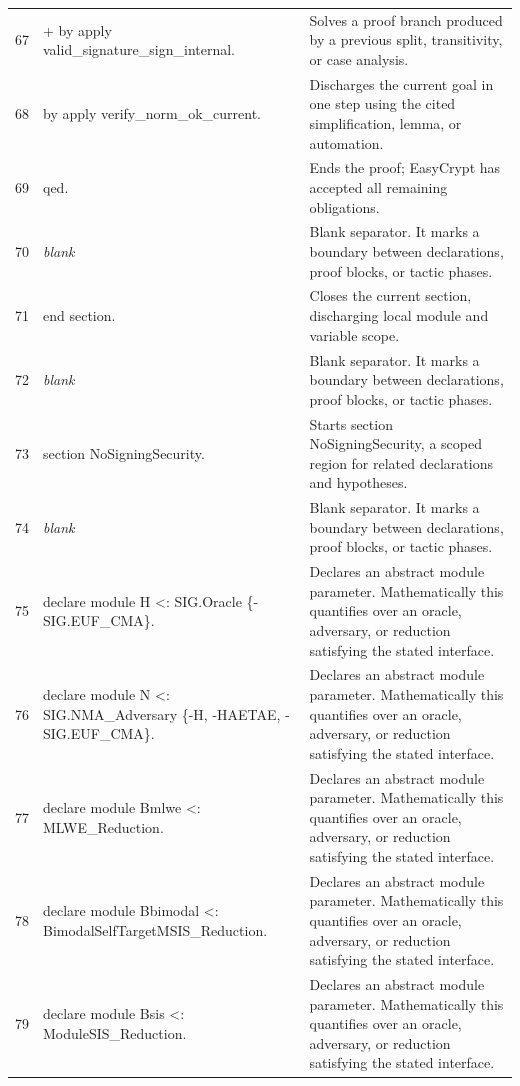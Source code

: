 \documentclass[10pt]{article}
\begin{document}
\begin{longtable}{r L{0.53\textwidth} L{0.37\textwidth}}
67 & {\ttfamily\scriptsize + by apply valid\_signature\_sign\_internal.} & Solves a proof branch produced by a previous split, transitivity, or case analysis. \\
68 & {\ttfamily\scriptsize by apply verify\_norm\_ok\_current.} & Discharges the current goal in one step using the cited simplification, lemma, or automation. \\
69 & {\ttfamily\scriptsize qed.} & Ends the proof; EasyCrypt has accepted all remaining obligations. \\
70 & {\ttfamily\scriptsize \emph{blank}} & Blank separator.  It marks a boundary between declarations, proof blocks, or tactic phases. \\
71 & {\ttfamily\scriptsize end section.} & Closes the current section, discharging local module and variable scope. \\
72 & {\ttfamily\scriptsize \emph{blank}} & Blank separator.  It marks a boundary between declarations, proof blocks, or tactic phases. \\
73 & {\ttfamily\scriptsize section NoSigningSecurity.} & Starts section NoSigningSecurity, a scoped region for related declarations and hypotheses. \\
74 & {\ttfamily\scriptsize \emph{blank}} & Blank separator.  It marks a boundary between declarations, proof blocks, or tactic phases. \\
75 & {\ttfamily\scriptsize declare module H <: SIG.Oracle \{-SIG.EUF\_CMA\}.} & Declares an abstract module parameter.  Mathematically this quantifies over an oracle, adversary, or reduction satisfying the stated interface. \\
76 & {\ttfamily\scriptsize declare module N <: SIG.NMA\_Adversary \{-H, -HAETAE, -SIG.EUF\_CMA\}.} & Declares an abstract module parameter.  Mathematically this quantifies over an oracle, adversary, or reduction satisfying the stated interface. \\
77 & {\ttfamily\scriptsize declare module Bmlwe <: MLWE\_Reduction.} & Declares an abstract module parameter.  Mathematically this quantifies over an oracle, adversary, or reduction satisfying the stated interface. \\
78 & {\ttfamily\scriptsize declare module Bbimodal <: BimodalSelfTargetMSIS\_Reduction.} & Declares an abstract module parameter.  Mathematically this quantifies over an oracle, adversary, or reduction satisfying the stated interface. \\
79 & {\ttfamily\scriptsize declare module Bsis <: ModuleSIS\_Reduction.} & Declares an abstract module parameter.  Mathematically this quantifies over an oracle, adversary, or reduction satisfying the stated interface. \\

\end{longtable}
\end{document}
